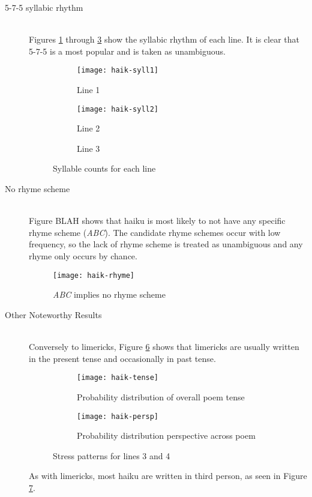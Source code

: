 \begin{description}
\item[5-7-5 syllabic rhythm]  \hfill \\
Figures \ref{fig:haik-syll1} through \ref{fig:haik-syll3} show the syllabic rhythm of each line. It is clear that 5-7-5 is a most popular and is taken as unambiguous.

\begin{figure}[H]
\centering
\begin{subfigure}[t]{0.5\textwidth}
	\centering
    \texttt{[image: haik-syll1]}
    \caption{Line 1}
    \label{fig:haik-syll1}
\end{subfigure}
\begin{subfigure}[t]{0.5\textwidth}
	\centering
    \texttt{[image: haik-syll2]}
    \caption{Line 2}
    \label{fig:haik-syll2}
\end{subfigure}
\begin{subfigure}[t]{0.9\textwidth}
	\centering
    \caption{Line 3}
    \label{fig:haik-syll3}
\end{subfigure}
\caption{Syllable counts for each line}
\label{fig:haik3}
\end{figure}

\item[No rhyme scheme]  \hfill \\
Figure BLAH shows that haiku is most likely to not have any specific rhyme scheme (\textit{ABC}). The candidate rhyme schemes occur with low frequency, so the lack of rhyme scheme is treated as unambiguous and any rhyme only occurs by chance.

\begin{figure}[H]
\centering
\texttt{[image: haik-rhyme]}
\caption{\textit{ABC} implies no rhyme scheme}
\label{fig:haik-rhyme}
\end{figure}

\item[Other Noteworthy Results]  \hfill \\
Conversely to limericks, Figure \ref{fig:haik-tense} shows that limericks are usually written in the present tense and occasionally in past tense.

\begin{figure}[H]
\centering
\begin{subfigure}[t]{0.5\textwidth}
	\centering
    \texttt{[image: haik-tense]}
    \caption{Probability distribution of overall poem tense}
    \label{fig:haik-tense}
\end{subfigure}
\begin{subfigure}[t]{0.5\textwidth}
	\centering
    \texttt{[image: haik-persp]}
    \caption{Probability distribution perspective across poem}
    \label{fig:haik-persp}
\end{subfigure}
\caption{Stress patterns for lines 3 and 4}
\label{fig:haik5}
\end{figure}

As with limericks, most haiku are written in third person, as seen in Figure \ref{fig:haik-persp}.

\end{description}

